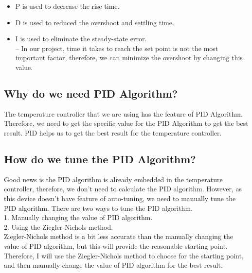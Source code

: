 \documentclass{article}
\begin{document}
\begin{itemize}
   \item{P is used to decrease the rise time.}
   \item{D is used to reduced the overshoot and settling time.}
   \item {I is used to eliminate the steady-state error.} \\
   -- In our project, time it takes to reach the set point is not the most important factor, therefore, we can minimize the overshoot by changing this value.
\end{itemize}

\subsection{Why do we need PID Algorithm?}
The temperature controller that we are using has the feature of PID Algorithm.
Therefore, we need to get the specific value for the PID Algorithm to get the best result.
PID helps us to get the best result for the temperature controller.
\subsection{How do we tune the PID Algorithm?}
Good news is the PID algorithm is already embedded in the temperature controller, therefore, we don't need to calculate the PID algorithm.
However, as this device doesn't have feature of auto-tuning, we need to manually tune the PID algorithm.
There are two ways to tune the PID algorithm. \\
1. Manually changing the value of PID algorithm. \\
2. Using the Ziegler-Nichols method. \\
Ziegler-Nichols method is a bit less accurate than the manually changing the value of PID algorithm, 
but this will provide the reasonable starting point. 
Therefore, I will use the Ziegler-Nichols method to choose for the starting point, 
and then manually change the value of PID algorithm for the best result. 


\end{document}
